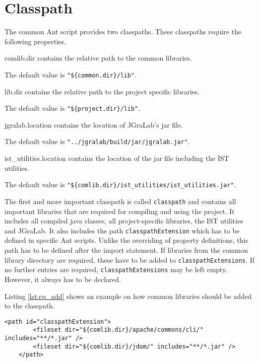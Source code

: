 \documentclass[a4paper,twoside,11pt,bibtotoc]{article}
\begin{document}
\section{Classpath}
\label{sec:classpath}
The common Ant script provides two classpaths.
These classpaths require the following properties.

\begin{description*}
	\item[comlib.dir] contains the relative path to the common libraries.\par The default value is \texttt{"\$\{common.dir\}/lib"}.
	\item[lib.dir] contains the relative path to the project specific libraries.\par The default value is \texttt{"\$\{project.dir\}/lib"}.
	\item[jgralab.location] contains the location of JGraLab's jar file.\par The default value is \texttt{"../jgralab/build/jar/jgralab.jar"}.
	\item[ist\_utilities.location] contains the location of the jar file including the IST utilities.\par The default value is \texttt{"\$\{comlib.dir\}/ist\_utilities/ist\_utilities.jar"}.
\end{description*}

The first and more important classpath is called \texttt{classpath} and contains all important libraries that are required for compiling and using the project.
It includes all compiled java classes, all project-specific libraries, the IST utilities and JGraLab.
It also includes the path \texttt{classpathExtension} which has to be defined in specific Ant scripts.
Unlike the overriding of property definitions, this path has to be defined after the import statement.
If libraries from the common library directory are required, these have to be added to \texttt{classpathExtensions}.
If no further entries are required, \texttt{classpathExtensions} may be left empty.
However, it always has to be declared.

Listing \ref{lst:cp_add} shows an example on how common libraries should be added to the classpath.

\begin{lstlisting}[caption=Adding common libraries to the classpath,label=lst:cp_add,float=!ht,language=Ant]
	<path id="classpathExtension">
		<fileset dir="${comlib.dir}/apache/commons/cli/" includes="**/*.jar" />
		<fileset dir="${comlib.dir}/jdom/" includes="**/*.jar" />
	</path>
\end{lstlisting}
\end{document}

